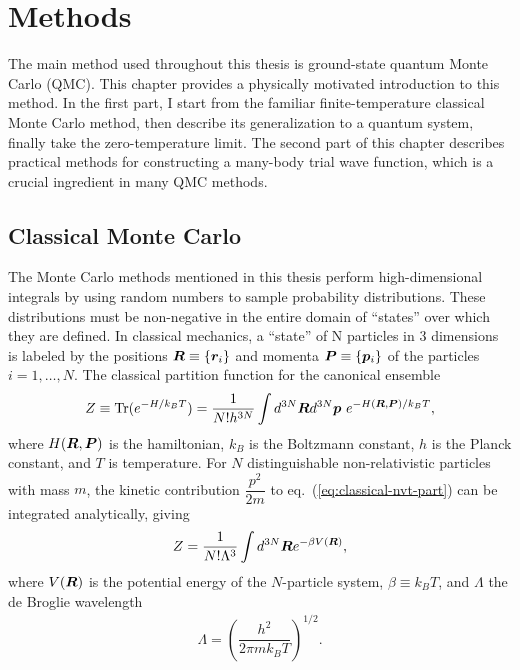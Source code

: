 \chapter{Methods} \label{chap:method}

The main method used throughout this thesis is ground-state quantum Monte Carlo (QMC). This chapter provides a physically motivated introduction to this method.
In the first part, I start from the familiar finite-temperature classical Monte Carlo method, then describe its generalization to a quantum system, finally take the zero-temperature limit.
The second part of this chapter describes practical methods for constructing a many-body trial wave function, which is a crucial ingredient in many QMC methods.

\section{Classical Monte Carlo}
The Monte Carlo methods mentioned in this thesis perform high-dimensional integrals by using random numbers to sample probability distributions. These distributions must be non-negative in the entire domain of ``states'' over which they are defined. In classical mechanics, a ``state'' of N particles in $3$ dimensions is labeled by the positions $\boldsymbol{R}\equiv\{\boldsymbol{r}_i\}$ and momenta $\boldsymbol{P}\equiv\{\boldsymbol{p}_i\}$ of the particles $i=1,\dots,N$. The classical partition function for the canonical ensemble
\begin{align} \label{eq:classical-nvt-part}
Z \equiv \text{Tr}(e^{-H/k_BT}) = \dfrac{1}{N!h^{3N}} \int d^{3N}\boldsymbol{R} d^{3N}\boldsymbol{p}~e^{-H(\boldsymbol{R}, \boldsymbol{P})/k_BT},
\end{align}
where $H(\boldsymbol{R}, \boldsymbol{P})$ is the hamiltonian, $k_B$ is the Boltzmann constant, $h$ is the Planck constant, and $T$ is temperature. For $N$ distinguishable non-relativistic particles with mass $m$, the kinetic contribution $\dfrac{p^2}{2m}$ to eq.~(\ref{eq:classical-nvt-part}) can be integrated analytically, giving
\begin{align}\label{eq:classical-nvt-part-v}
Z = \dfrac{1}{N!\Lambda^{3}} \int d^{3N}\boldsymbol{R} e^{-\beta V(\boldsymbol{R})},
\end{align}
where $V(\boldsymbol{R})$ is the potential energy of the $N$-particle system, $\beta\equiv k_BT$, and $\Lambda$ the de Broglie wavelength
\begin{align} \label{eq:debroglie}
\Lambda = \left(
\dfrac{h^2}{2\pi mk_BT}
\right)^{1/2}.
\end{align}

